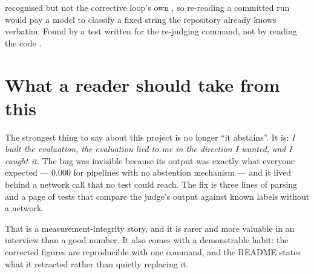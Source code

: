 \begin{finding}
 recognised  but not the corrective loop's own , so re-reading a committed run would pay a model to classify a fixed string the repository already knows verbatim. Found by a test written for the re-judging command, not by reading the code \tagV.
\end{finding}

\section{What a reader should take from this}

\begin{interview}
The strongest thing to say about this project is no longer \enquote{it abstains}. It is: \emph{I built the evaluation, the evaluation lied to me in the direction I wanted, and I caught it.} The bug was invisible because its output was exactly what everyone expected --- 0.000 for pipelines with no abstention mechanism --- and it lived behind a network call that no test could reach. The fix is three lines of parsing and a page of tests that compare the judge's output against known labels without a network.

That is a measurement-integrity story, and it is rarer and more valuable in an interview than a good number. It also comes with a demonstrable habit: the corrected figures are reproducible with one command, and the README states what it retracted rather than quietly replacing it.
\end{interview}
